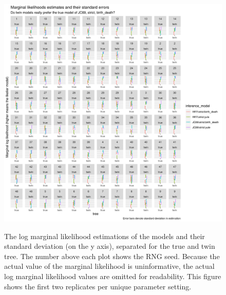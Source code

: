 \begin{figure}[!htbp]
  \includegraphics[width=\textwidth]{20190904_fig_marg_liks.png}
  \label{fig:marg_liks}
  \caption{The log marginal likelihood estimations of the models and their
    standard deviation (on the y axis), separated for the true and twin tree. 
    The number above each plot shows the RNG seed. Because the actual value
    of the marginal likelihood is uninformative, the actual log marginal 
    likelihood values are omitted for readability.
    This figure shows the first two replicates per
    unique parameter setting.
  }
\end{figure}





